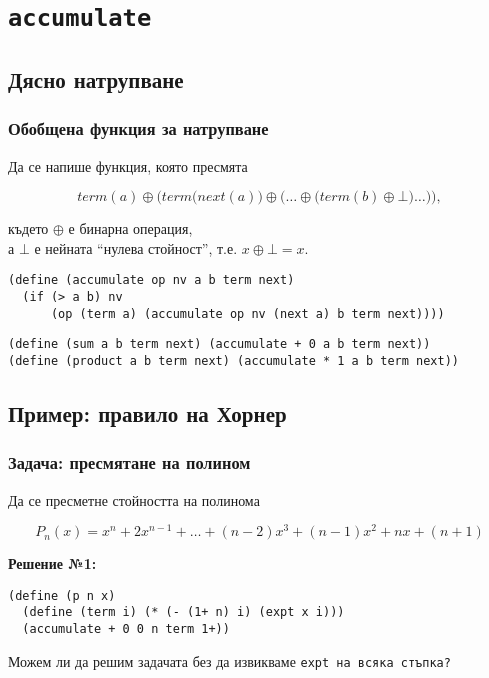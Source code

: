 \documentclass{beamer}
\begin{document}
\section{\tt{accumulate}}

\subsection{Дясно натрупване}

\begin{frame}[fragile]
  \frametitle{Обобщена функция за натрупване}

  Да се напише функция, която пресмята

  \begin{equation*}
    term(a) \oplus \bigg(term\big(next(a)\big) \oplus \Big(\ldots \oplus \big(term(b) \oplus \bot\big) \ldots\Big)\bigg),
  \end{equation*}

  където $\oplus$ е бинарна операция,\\
  а $\bot$ е нейната ``нулева стойност'', т.е. $x\oplus\bot = x$.

  \pause
\small
\begin{verbatim}
(define (accumulate op nv a b term next)
  (if (> a b) nv
      (op (term a) (accumulate op nv (next a) b term next))))
\end{verbatim}
\pause
\begin{verbatim}
(define (sum a b term next) (accumulate + 0 a b term next))
(define (product a b term next) (accumulate * 1 a b term next))
\end{verbatim}
\end{frame}

\subsection{Пример: правило на Хорнер}

\newcommand{\pnx}{x^n + 2x^{n-1} + \ldots + (n-2)x^3 + (n-1)x^2 + nx + (n+1)}

\begin{frame}[fragile]
  \frametitle{Задача: пресмятане на полином}

  Да се пресметне стойността на полинома

  \begin{equation*}
  P_n(x) = \pnx
  \end{equation*}
  \vspace{1em}

  \pause

  \textbf{Решение №1:}
\begin{verbatim}
(define (p n x)
  (define (term i) (* (- (1+ n) i) (expt x i)))
  (accumulate + 0 0 n term 1+))
\end{verbatim}

  \pause

  \vspace{1em}
  \alert{Можем ли да решим задачата без да извикваме \tt{expt} на всяка стъпка?}
\end{frame}
\end{document}

